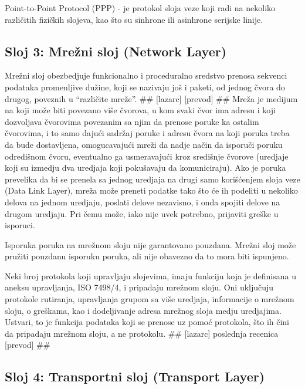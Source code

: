 \documentclass[a4paper,12pt, master]{etf}
\begin{document}
	Point-to-Point Protocol (PPP) - je protokol sloja veze koji radi na
	nekoliko razli\v{c}itih	fizi\v{c}kih slojeva, kao \v{s}to su sinhrone ili
	asinhrone serijske linije.

	\subsection{Sloj 3: Mre\v{z}ni sloj (Network Layer)}

	Mre\v{z}ni sloj obezbedjuje funkcionalno i proceduralno sredstvo prenosa
	sekvenci podataka promenljive du\v{z}ine, koji se nazivaju jo\v{s} i paketi,
	od jednog \v{c}vora do drugog, poveznih u ``razli\v{c}ite mre\v{z}e''.
	\#\# [lazarc] [prevod] \#\# Mre\v{z}a je medijum na koji mo\v{z}e biti
	povezano vi\v{s}e \v{c}vorova, u kom svaki \v{c}vor ima adresu i koji
	dozvoljava \v{c}vorovima povezanim sa njim da prenose poruke ka ostalim
	\v{c}vorovima, i to samo daju\'{c}i sadr\v{z}aj poruke i adresu \v{c}vora
	na koji poruka treba da bude dostavljena, omogucavaju\'{c}i mre\v{z}i da
	nadje na\v{c}in da isporu\v{c}i poruku odredi\v{s}nom \v{c}voru, eventualno
	ga usmeravaju\'{c}i kroz sredi\v{s}nje \v{c}vorove (uredjaje koji su
	izmedju dva uredjaja koji poku\v{s}avaju da komuniciraju). Ako je poruka
	prevelika da bi se prenela sa jednog uredjaja na drugi samo
	kori\v{s}\'{c}enjem sloja veze (Data Link Layer), mre\v{z}a mo\v{z}e
	preneti podatke tako \v{s}to \'{c}e ih podeliti u nekoliko delova na jednom
	uredjaju, poslati delove nezavisno, i onda spojiti delove na drugom
	uredjaju. Pri \v{c}emu mo\v{z}e, iako nije uvek potrebno, prijaviti
	gre\v{s}ke u isporuci.

	Isporuka poruka na mre\v{z}nom sloju nije garantovano pouzdana. Mre\v{z}ni
	sloj mo\v{z}e pru\v{z}iti pouzdanu isporuku poruka, ali nije obavezno da to
	mora biti ispunjeno.

	Neki broj protokola koji upravljaju slojevima, imaju funkciju koja je
	definisana u aneksu	upravljanja, ISO 7498/4, i pripadaju mre\v{z}nom sloju.
	Oni uklju\v{c}uju protokole rutiranja, upravljanja grupom sa vi\v{s}e
	uredjaja, informacije o mre\v{z}nom sloju, o gre\v{s}kama, kao i
	dodeljivanje adresa mre\v{z}nog sloja medju uredjajima. Ustvari, to je
	funkcija podataka koji se prenose uz pomo\'{c} protokola, \v{s}to ih
	\v{c}ini da pripadaju mre\v{z}nom sloju, a ne protokolu.
	\#\# [lazarc] poslednja	recenica [prevod] \#\#

	\subsection{Sloj 4: Transportni sloj (Transport Layer)}
\end{document}
